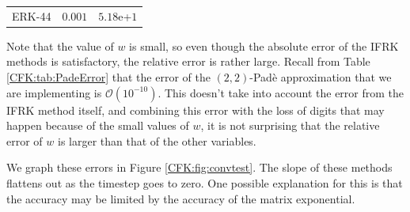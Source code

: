 \documentclass{csri19}
\begin{document}
\begin{table}[ht]
{{\begin{tabular}{c|c|c}
      ERK-44          & $0.001$           & $5.18$e+$1$
    \end{tabular}}}\quad
\end{table}

Note that the value of $w$ is small, so even though the absolute error 
of the IFRK methods is satisfactory, the relative error is rather
 large. Recall from Table \ref{CFK:tab:PadeError} that the error of the 
$(2,2)$-Pad\`e approximation that we are implementing is $\mathcal{O}(10^{-10})$.
This doesn't take into account the error from the IFRK method itself, 
and combining this error with the loss of digits that may happen because of 
the small values of $w$, it is not surprising that the relative error of 
$w$ is larger than that of the other variables.

We graph these errors in Figure \ref{CFK:fig:convtest}. The slope of these 
methods flattens out as the timestep goes to zero. One possible 
explanation for this is that the accuracy may be limited by the accuracy of 
the matrix exponential.
\end{document}
